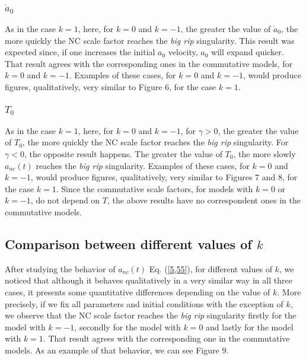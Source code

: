 \documentclass[12pt]{article}
\newcommand{\0}{{(0)}}
\newcommand{\1}{{(1)}}
\newcommand{\2}{{(2)}}
\begin{document}
{\subsubsection{$\dot{a}_0$}
\label{dota0}

As in the case $k=1$, here, for $k=0$ and $k=-1$, the greater the value of 
$\dot{a}_0$, the more quickly the NC scale factor reaches the {\it big rip} singularity. This result was expected since, if one increases the initial $a_0$ velocity, $a_0$ will expand quicker. That result agrees with the corresponding ones in the commutative models, for $k=0$ and $k=-1$.
Examples of these cases, for $k=0$ and $k=-1$, would produce figures, qualitatively, very similar to Figure 6, for the case $k=1$.

\subsubsection{$T_0$}
As in the case $k=1$, here, for $k=0$ and $k=-1$, for $\gamma > 0$, the greater the value of $T_0$, the more quickly 
the NC scale factor reaches the {\it big rip} singularity.
For $\gamma < 0$, the opposite result happens. The greater the value of $T_0$, the more slowly 
$a_{nc}(t)$ reaches the {\it big rip} singularity. Examples of these cases, for $k=0$ and $k=-1$, would produce figures, qualitatively, very similar to Figures 7 and 8, for the case $k=1$. Since the commutative scale factors, for models with $k=0$ or $k=-1$, do not depend on $T$, the above results have no correspondent ones in the commutative models.

\subsection{Comparison between different values of $k$}
\label{ks}

After studying the behavior of $a_{nc}(t)$ Eq. (\ref{5,55}), for different values of $k$, we noticed that although it
behaves qualitatively in a very similar way in all three cases, it presents some quantitative differences depending on 
the value of $k$. More precisely, if we fix all parameters and initial conditions with the exception of $k$, we observe
that the NC scale factor reaches the {\it big rip} singularity firstly for the model with $k=-1$, secondly for the
model with $k=0$ and lastly for the model with $k=1$. That result agrees with the corresponding one in the commutative models.
As an example of that behavior, we can see Figure 9.

}
\end{document}
